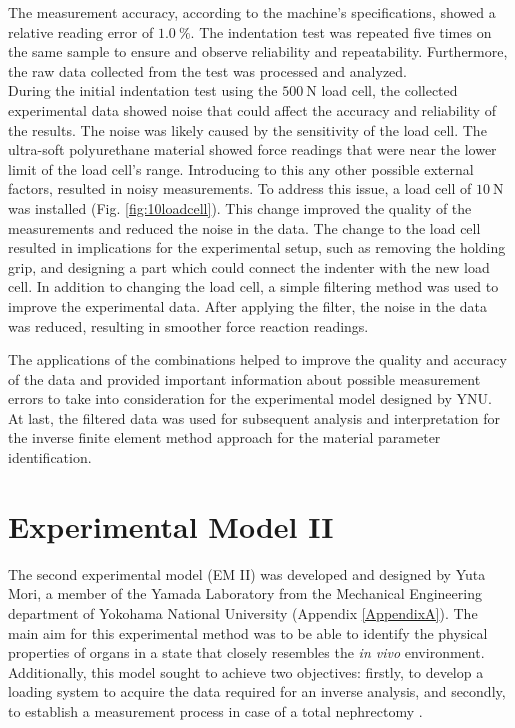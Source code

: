 The measurement accuracy, according to the machine's specifications, showed 
a relative reading error of $\SI{1.0}{\percent}$. The indentation test 
was repeated five times on the same sample to ensure and observe 
reliability and repeatability. Furthermore, the raw data collected from the test 
was processed and analyzed.\\

During the initial indentation test using the $\SI{500}{\newton}$ load cell, 
the collected experimental data showed noise that could affect the accuracy 
and reliability of the results. The noise was likely caused by the sensitivity 
of the load cell. The ultra-soft polyurethane material showed force readings that
were near the lower limit of the load cell's range. Introducing to this any other possible external factors, 
resulted in noisy measurements. To address this issue, a load cell of $\SI{10}{\newton}$
was installed (Fig. \ref{fig:10loadcell}). This change improved the quality of 
the measurements and reduced the noise in the data. The change to the load cell resulted in  
implications for the experimental setup, such as removing the holding grip, and designing 
a part which could connect the indenter with the new load cell. In addition to changing 
the load cell, a simple filtering method was used to improve the experimental data. After 
applying the filter, the noise in the data was reduced, resulting in smoother 
force reaction readings. 

The applications of the combinations helped to improve the quality and accuracy 
of the data and provided important information about possible measurement errors to 
take into consideration for the experimental model 
designed by YNU. At last, the filtered data was used for subsequent analysis and 
interpretation for the inverse finite element method approach for the material parameter 
identification.

\section{Experimental Model II}
\label{section:expmod2}

The second experimental model (EM II) was developed and designed by Yuta Mori, a 
member of the Yamada Laboratory from the Mechanical Engineering department of 
Yokohama National University (Appendix \ref{AppendixA}). 
The main aim for this experimental method was to be able to identify the physical 
properties of organs in a state that closely resembles the \textit{in vivo} environment.
Additionally, this model sought to achieve two objectives: firstly, to develop a 
loading system to acquire the data required for an inverse analysis, and secondly, 
to establish a measurement process in case of a total nephrectomy \cite{Mori2022}. 

